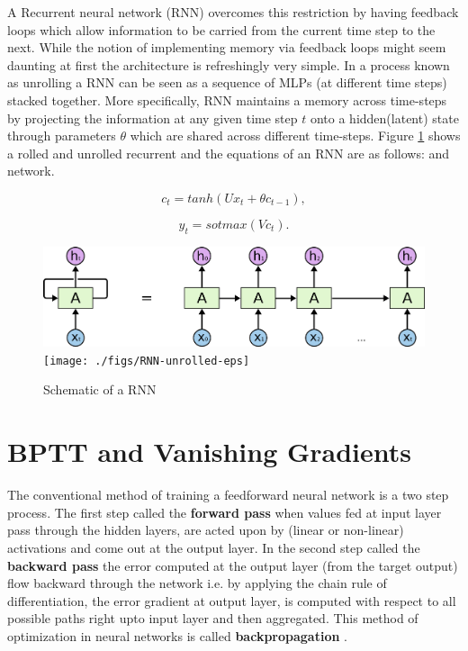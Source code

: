 A Recurrent neural network (RNN) \citep{Hopfield1982}\citep{Elman1990} overcomes this restriction by having feedback loops which allow information to be carried from the current time step to the next. While the notion of implementing memory via feedback loops might seem daunting at first the architecture is refreshingly very simple. In a process known as unrolling a RNN can be seen as a sequence of MLPs (at different time steps) stacked together. More specifically, RNN maintains a memory across time-steps by projecting the information at any given time step $t$ onto a hidden(latent) state through parameters $\theta$ which are shared across different time-steps. Figure \ref{bck:rnn} shows a rolled and unrolled recurrent and the equations of an RNN are as follows: and  network.

\begin{equation}\label{nn-dynam}
c_t = tanh(Ux_t + \theta c_{t-1}),
\end{equation}

\begin{equation}
y_t = sotmax(Vc_t).
\end{equation}

\begin{figure}
	\begin{minipage}[t]{\textwidth}
		\ifpdf
		\includegraphics[width=\linewidth,keepaspectratio=true]{./figs/RNN-unrolled-pdf}
		\else
		\texttt{[image: ./figs/RNN-unrolled-eps]}
		\fi
		\caption{\small Schematic of a RNN \cite{olah}}
		\label{bck:rnn}
	\end{minipage}
\end{figure}

\section{BPTT and Vanishing Gradients}
The conventional method of training a feedforward neural network is a two step process. The first step called the \textbf{forward pass} when values fed at input layer pass through the hidden layers, are acted upon by (linear or non-linear) activations and come out at the output layer. In the second step called the \textbf{backward pass}  the error computed at the output layer (from the target output) flow backward through the network i.e. by applying the chain rule of differentiation, the error gradient at output layer, is computed with respect to all possible paths right upto input layer and then aggregated. This method of optimization in neural networks is called \textbf{backpropagation} \citep{Rumelhart1986}.


